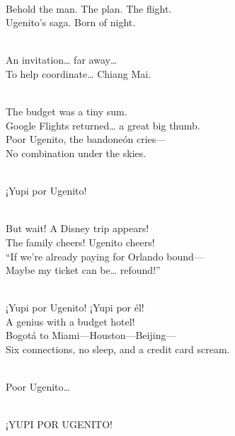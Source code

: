\begin{lyrics}

\\
Behold the man. %
The plan. %
The flight.\\
Ugenito’s saga. %
Born of night.


\\
An invitation… far away…\\
To help coordinate… Chiang Mai.



\\
The budget was a tiny sum.\\
Google Flights returned… a great big thumb.\\
Poor Ugenito, the bandoneón cries—\\
No combination under the skies.

\\
¡Yupi por Ugenito!


\\
But wait! A Disney trip appears!\\
The family cheers! Ugenito cheers!\\
“If we’re already paying for Orlando bound—\\
Maybe my ticket can be… refound!”


\\
¡Yupi por Ugenito! ¡Yupi por él!\\
A genius with a budget hotel!\\
Bogotá to Miami—Houston—Beijing—\\
Six connections, no sleep, and a credit card scream.

\\
Poor Ugenito…

\\
¡YUPI POR UGENITO!


\end{lyrics}
